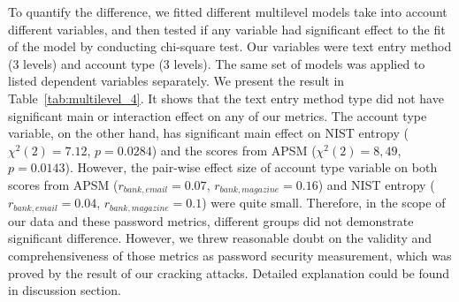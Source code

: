 \documentclass[conference]{IEEEtran}
\begin{document}
To quantify the difference, we fitted different multilevel models take into account different variables, and then tested if any variable had significant effect to the fit of the model by conducting chi-square test. Our variables were text entry method (3 levels) and account type (3 levels). The same set of models was applied to listed dependent variables separately. We present the result in Table~\ref{tab:multilevel_4}. It shows that the text entry method type did not have significant main or interaction effect on any of our metrics. The account type variable, on the other hand, has significant main effect on NIST entropy ($\chi^{2}(2)=7.12$, $p=0.0284$) and the scores from APSM ($\chi^{2}(2)=8,49$, $p=0.0143$). However, the pair-wise effect size of account type variable on both scores from APSM ($r_{bank, email}=0.07$, $r_{bank, magazine}=0.16$) and NIST entropy ($r_{bank, email}=0.04$, $r_{bank, magazine}=0.1$) were quite small. Therefore, in the scope of our data and these password metrics, different groups did not demonstrate significant difference. 
However, we threw reasonable doubt on the validity and comprehensiveness of those metrics as password security measurement, which was proved by the result of our cracking attacks. Detailed explanation could be found in discussion section.

\begin{table}[thbp]
\begin{center}
  \caption{Result of chi-square fit test on multilevel models applied on three security metrics. Variables in the model were text entry method type and account type. The term ``interaction" stands for the interaction effect between terminal type and account type.}
    \label{tab:multilevel_4}
\end{center}
\end{table}
\end{document}
